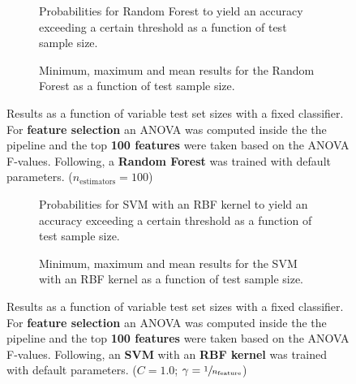 \begin{figure}
    \captionsetup[subfigure]{justification=justified,singlelinecheck=false}
    \begin{subfigure}[t]{0.61\textwidth}
        
        \caption{Probabilities for Random Forest to yield an accuracy exceeding a certain threshold as a function of test sample size.}
    \end{subfigure}
    \hspace{3.0mm}
    \begin{subfigure}[t]{0.34\textwidth}
        
        \caption{Minimum, maximum and mean results for the Random Forest as a function of test sample size.}
    \end{subfigure}
    \caption[Effects of varying test sample size. Random Forest; Preprocessing: ANOVA feature selection ($k_\text{best} = \num{100}$)]{Results as a function of variable test set sizes with a fixed classifier. For \textbf{feature selection} an ANOVA was computed inside the the pipeline and the top \textbf{100 features} were taken based on the ANOVA F-values. Following, a \textbf{{Random Forest}} was trained with default parameters. ($n_\text{estimators}=\num{100}$)}
    \label{fig:no_PCA_100_best_selected_RandomForest}
\end{figure}

\begin{figure}
    \captionsetup[subfigure]{justification=justified,singlelinecheck=false}
    \begin{subfigure}[t]{0.61\textwidth}
        
        \caption{Probabilities for SVM with an RBF kernel to yield an accuracy exceeding a certain threshold as a function of test sample size.}
    \end{subfigure}
    \hspace{3.0mm}
    \begin{subfigure}[t]{0.34\textwidth}
        
        \caption{Minimum, maximum and mean results for the SVM with an RBF kernel as a function of test sample size.}
    \end{subfigure}
    \caption[Effects of varying test sample size. SVM (kernel = RBF); Preprocessing: ANOVA feature selection ($k_\text{best} = \num{100}$)]{Results as a function of variable test set sizes with a fixed classifier. For \textbf{feature selection} an ANOVA was computed inside the the pipeline and the top \textbf{100 features} were taken based on the ANOVA F-values. Following, an \textbf{{SVM}} with an \textbf{{RBF kernel}} was trained with default parameters. ($C=\num{1.0}$; $\gamma=\sfrac{1}{n_\text{feature}}$)}
    \label{fig:no_PCA_100_best_selected_SVC}
\end{figure}


